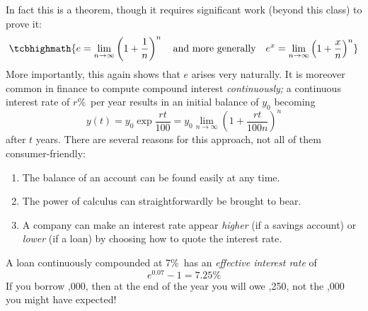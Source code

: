In fact this is a theorem, though it requires significant work (beyond this class) to prove it:
\[\tcbhighmath{e=\lim_{n\to\infty}\left(1+\frac 1n\right)^n\quad\text{and more generally}\quad e^x =\lim_{n\to\infty}\left(1+\frac xn\right)^n}\]
More importantly, this again shows that $e$ arises very naturally. It is moreover common in finance to compute compound interest \emph{continuously;} a continuous interest rate of $r$\%\ per year results in an initial balance of $y_0$ becoming
\[y(t)=y_0\exp\frac{rt}{100} =y_0\lim_{n\to\infty}\left(1+\frac{rt}{100n}\right)^n\]
after $t$ years. There are several reasons for this approach, not all of them consumer-friendly:
\begin{enumerate}\itemsep0pt
  \item The balance of an account can be found easily at any time.
  \item The power of calculus can straightforwardly be brought to bear.
  \item A company can make an interest rate appear \emph{higher} (if a savings account) or \emph{lower} (if a loan) by choosing how to quote the interest rate.
\end{enumerate}


\begin{example}{}{}
A loan continuously compounded at 7\%\ has an \emph{effective interest rate}\footnotemark{} of
\[e^{0.07}-1=7.25\%\]
If you borrow ,000, then at the end of the year you will owe ,250, not the ,000 you might have expected!
\end{example}


\clearpage

